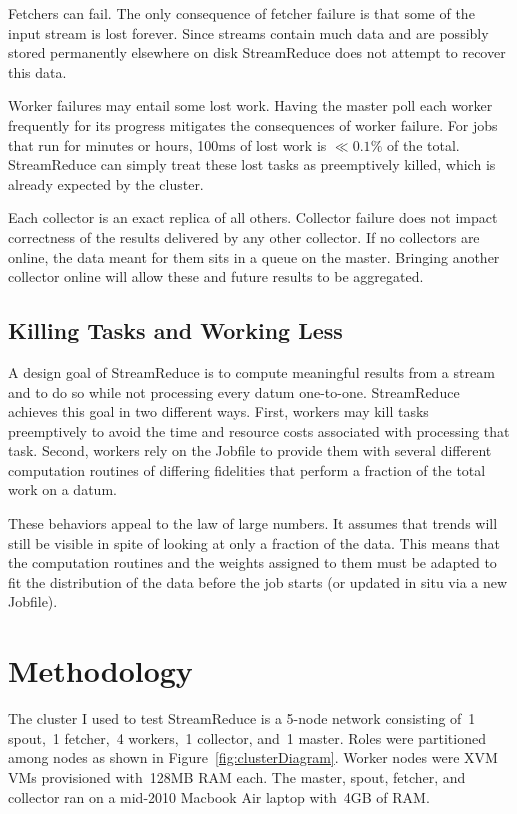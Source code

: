 \documentclass[12pt,twocolumn]{article}
\begin{document}
Fetchers can fail. The only consequence of fetcher failure is that some of the input stream is
lost forever. Since streams contain much data and are possibly stored permanently elsewhere on disk
StreamReduce does not attempt to recover this data.

Worker failures may entail some lost work. Having the master poll each worker frequently for its
progress mitigates the consequences of worker failure. For jobs that run for minutes or hours,
100ms of lost work is $\ll0.1\%$ of the total. StreamReduce can simply treat these lost tasks as preemptively
killed, which is already expected by the cluster.

Each collector is an exact replica of all others. Collector failure does not impact correctness of
the results delivered by any other collector. If no collectors are online, the data meant for them
sits in a queue on the master. Bringing another collector online will allow these and future results
to be aggregated.
\subsection{Killing Tasks and Working Less}
A design goal of StreamReduce is to compute meaningful results from a stream and to do so while not
processing every datum one-to-one. StreamReduce achieves this goal in two different ways. First, workers
may kill tasks preemptively to avoid the time and resource costs associated with processing
that task. Second, workers rely on the Jobfile to provide them with several different
computation routines of differing fidelities that perform a fraction of the total work on a
datum.

These behaviors appeal to the law of large numbers. It assumes that trends will still be
visible in spite of looking at only a fraction of the data. This means that the computation
routines and the weights assigned to them must be adapted to fit the distribution of the data
before the job starts (or updated in situ via a new Jobfile).

\section{Methodology}
\label{sec:methodology}
The cluster I used to test StreamReduce is a 5-node network consisting of~1 spout,~1 fetcher,~4 workers,~1
collector, and~1 master. Roles were partitioned among nodes as shown in
Figure~\ref{fig:clusterDiagram}. Worker nodes were XVM~\cite{sipb:xvm} VMs provisioned with~128MB RAM each.
The master, spout, fetcher, and collector ran on a mid-2010 Macbook Air laptop with~4GB of RAM.
\end{document}
